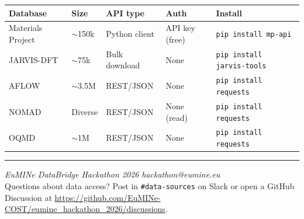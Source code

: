 \documentclass[11pt,a4paper]{article}
\begin{document}
\begin{center}
\begin{tabular}{lllll}
\toprule
Database & Size & API type & Auth & Install \\
\midrule
Materials Project & $\sim$150k & Python client & API key (free) & \texttt{pip install mp-api} \\
JARVIS-DFT        & $\sim$75k  & Bulk download & None           & \texttt{pip install jarvis-tools} \\
AFLOW             & $\sim$3.5M & REST/JSON      & None           & \texttt{pip install requests} \\
NOMAD             & Diverse    & REST/JSON      & None (read)    & \texttt{pip install requests} \\
OQMD              & $\sim$1M   & REST/JSON      & None           & \texttt{pip install requests} \\
\bottomrule
\end{tabular}
\end{center}

\vspace{2em}
\noindent\rule{\linewidth}{0.4pt}
{\small
\textit{EuMINe DataBridge Hackathon 2026} \hfill \textit{hackathon@eumine.eu}\\
Questions about data access? Post in \texttt{\#data-sources} on Slack or open a
GitHub Discussion at
\url{https://github.com/EuMINe-COST/eumine_hackathon_2026/discussions}.
}
\end{document}
